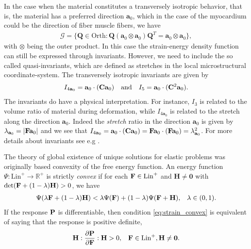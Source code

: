 In the case when the material constitutes a transversely isotropic
behavior, that is, the material has a preferred direction $\mathbf{a}_0$,
which in the case of the myocardium could be the direction of fiber
muscle fibers, we have
\begin{align*}
  \mathcal{G} = \{ \mathbf{Q} \in \mathrm{Orth}: \mathbf{Q}(\mathbf{a}_0\otimes\mathbf{a}_0)\mathbf{Q}^T = \mathbf{a}_0\otimes\mathbf{a}_0 \},
\end{align*}
with $\otimes$ being the outer product. In this case the strain-energy
density function can still be expressed through invariants. However,
we need to include the so called quasi-invariants, which are defined
as stretches in the local microstructural coordinate-system. The
transversely isotropic invariants are given by
\begin{align*}
  I_{4\mathbf{a}_0 } = \mathbf{a}_0 \cdot (\mathbf{C} \mathbf{a}_0) && \text{and} && I_5 = \mathbf{a}_0 \cdot (\mathbf{C}^2 \mathbf{a}_0).
\end{align*}
The invariants do have a physical interpretation. For instance, $I_3$
is related to the volume ratio of material during deformation, while
$I_{4\mathbf{a}_0 } $ is related to the stretch along the direction
$\mathbf{a}_0 $. Indeed the \emph{stretch} ratio in the direction
$\mathbf{a}_0$ is given by $\lambda_{\mathbf{a}_0} = | \mathbf{F} \mathbf{a}_0
|$ and we see that $I_{4\mathbf{a}_0 }  =  \mathbf{a}_0 \cdot (\mathbf{C}
\mathbf{a}_0) = \mathbf{F} \mathbf{a}_0 \cdot (\mathbf{F} \mathbf{a}_0) =
\lambda_{\mathbf{a}_0}^2$. For more details about invariants see e.g
\cite{holzapfel2009constitutive,liu1982representations}.


The theory of global existence of unique solutions for elastic problems
was originally based convexity of the free energy function.
An energy function $\Psi: \mathrm{Lin}^+ \rightarrow
\mathbb{R}^+$ is strictly \emph{convex} if for each $\mathbf{F} \in
\mathrm{Lin}^+$ and $\mathbf{H} \neq \mathbf{0}$ with $\det (\mathbf{F} +
(1-\lambda)\mathbf{H}) > 0$, we have
\begin{align}
  \Psi(\lambda \mathbf{F} + (1-\lambda) \mathbf{H})
  < \lambda \Psi(\mathbf{F})
  + (1-\lambda) \Psi(\mathbf{F} + \mathbf{H}), && \lambda \in (0,1).
\label{eq:strain_convex}
\end{align}
If the response $\mathbf{P}$ is differentiable, then condition
\eqref{eq:strain_convex} is equivalent of saying that the response is
positive definite, 
\begin{align}
  \mathbf{H} : \frac{\partial \mathbf{P}}{\partial \mathbf{F}} : \mathbf{H} > 0,
  && \mathbf{F} \in
     \mathrm{Lin}^+, \mathbf{H} \neq \mathbf{0}.
\label{eq:response_posdev}
\end{align}

